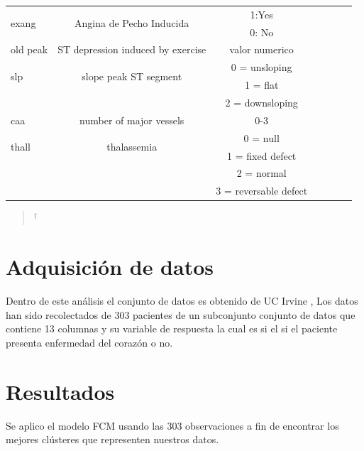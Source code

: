 \documentclass[10pt,journal]{IEEEtran}
\begin{document}
\begin{table}[t]
{\begin{tabular}{p{1.2cm} c c c p{2cm} c c }
\multirow{2}{2cm}{exang} & \multirow{2}{2cm}{Angina de Pecho Inducida} & 1:Yes \\ & & 0: No  \\\hline

old peak & ST depression induced by exercise & valor numerico \\\hline

\multirow{2}{2cm}{slp} & \multirow{2}{2cm}{slope peak ST segment} & 0 = unsloping \\ & & 1 = flat \\ & & 2 = downsloping\\\hline


caa & number of major vessels &  0-3 \\\hline




\multirow{2}{2cm}{thall } & \multirow{2}{2cm}{thalassemia} & 0 = null \\ & & 1 = fixed defect \\ & & 2 = normal \\ & & 3 = reversable defect\\\hline



\bottomrule
\end{tabular}%
}
\begin{quote}
\scriptsize
\centering
$^{\dagger}$ 
\end{quote}
\end{table}

\section{Adquisición de datos}
\label{sec:adquisiciondatos}

Dentro de este análisis el conjunto de datos es obtenido de UC Irvine \cite{UCI} , Los datos han sido recolectados de 303 pacientes de un subconjunto conjunto de datos que contiene 13 columnas y su variable de respuesta la cual es si el si el paciente presenta enfermedad del corazón o no.







\section{Resultados}

Se aplico el modelo FCM usando las 303 observaciones a fin de encontrar los mejores clústeres que representen nuestros datos.
\end{document}
